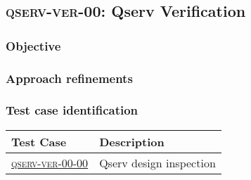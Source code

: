 \subsection{\textsc{qserv-ver-00}: Qserv Verification}
\label{qserv-ver-00}

\subsubsection{Objective}

\subsubsection{Approach refinements}

\subsubsection{Test case identification}

\begin{longtable} {|p{}|p{}|}\hline
\textbf{Test Case}  & \textbf{Description} \\\hline
\hyperref[qserv-ver-00-00]{\textsc{qserv-ver-00-00}} & Qserv design inspection \\\hline
\end{longtable}
